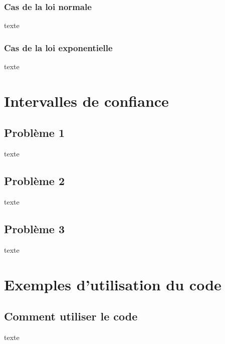 \documentclass{article}      %
\begin{document}
\subsubsection{Cas de la loi normale}
texte
\subsubsection{Cas de la loi exponentielle}
texte


\section{Intervalles de confiance}
\subsection{Problème 1}
texte
\subsection{Problème 2}
texte
\subsection{Problème 3}
texte



\section{Exemples d'utilisation du code}
\subsection{Comment utiliser le code}
texte
\end{document}
